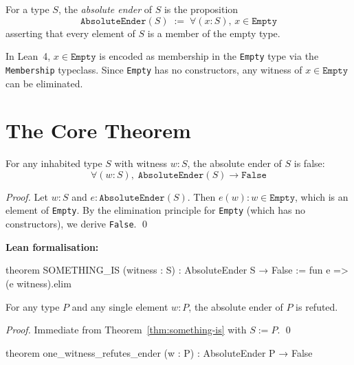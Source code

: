 \begin{definition}\label{def:ender}
For a type $S$, the \emph{absolute ender} of $S$ is the proposition
\[
\texttt{AbsoluteEnder}(S) \;:=\; \forall (x : S),\, x \in \texttt{Empty}
\]
asserting that every element of $S$ is a member of the empty type.
\end{definition}

\begin{remark}
In Lean~4, $x \in \texttt{Empty}$ is encoded as membership in the \texttt{Empty} type via the \texttt{Membership} typeclass. Since \texttt{Empty} has no constructors, any witness of $x \in \texttt{Empty}$ can be eliminated.
\end{remark}

\section{The Core Theorem}

\begin{theorem}[Something IS]\label{thm:something-is}
For any inhabited type $S$ with witness $w : S$, the absolute ender of $S$ is false:
\[
\forall (w : S),\; \texttt{AbsoluteEnder}(S) \to \texttt{False}
\]
\end{theorem}

\begin{proof}
Let $w : S$ and $e : \texttt{AbsoluteEnder}(S)$. Then $e(w) : w \in \texttt{Empty}$, which is an element of \texttt{Empty}. By the elimination principle for \texttt{Empty} (which has no constructors), we derive \texttt{False}. \qed
\end{proof}

\noindent\textbf{Lean formalisation:}

\begin{leancode}
theorem SOMETHING_IS (witness : S) :
    AbsoluteEnder S → False :=
    fun e => (e witness).elim
\end{leancode}

\begin{corollary}\label{cor:one-witness}
For any type $P$ and any single element $w : P$, the absolute ender of $P$ is refuted.
\end{corollary}

\begin{proof}
Immediate from Theorem~\ref{thm:something-is} with $S := P$. \qed
\end{proof}

\begin{leancode}
theorem one_witness_refutes_ender (w : P) :
    AbsoluteEnder P → False
\end{leancode}

